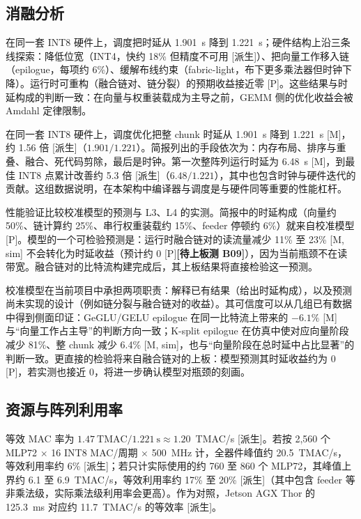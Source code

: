 \documentclass[a4paper,10.5pt]{ctexart}
\newcommand{\tM}{\textsf{[M]}}              %
\newcommand{\tP}{\textsf{[P]}}              %
\newcommand{\tMsim}{\textsf{[M, sim]}}      %
\newcommand{\tD}{\textsf{[派生]}}           %
\newcommand{\tB}[1]{\textcolor{red!70!black}{\textsf{\textbf{[待上板测 #1]}}}}
\begin{document}
\subsection{消融分析}\label{sec:ablation}

在同一套 INT8 硬件上，调度把时延从 1.901~s 降到 1.221~s；硬件结构上沿三条线探索：降低位宽（INT4，快约 18\% 但精度不可用 \tD）、把向量工作移入链（epilogue，每项约 6\%）、缓解布线约束（fabric-light，布下更多乘法器但时钟下降）。运行时可重构（融合链对、链分裂）的预期收益接近零 \tP。这些结果与时延构成的判断一致：在向量与权重装载成为主导之前，GEMM 侧的优化收益会被 Amdahl 定律限制。

在同一套 INT8 硬件上，调度优化把整 chunk 时延从 1.901~s 降到 1.221~s \tM，约 1.56 倍 \tD（$1.901/1.221$）。简报列出的手段依次为：内存布局、排序与重叠、融合、死代码剪除，最后是时钟。第一次整阵列运行时延为 6.48~s \tM，到最佳 INT8 点累计改善约 5.3 倍 \tD（$6.48/1.221$），其中也包含时钟与硬件迭代的贡献。这组数据说明，在本架构中编译器与调度是与硬件同等重要的性能杠杆。

性能验证比较校准模型的预测与 L3、L4 的实测。简报中的时延构成（向量约 50\%、链计算约 25\%、串行权重装载约 15\%、feeder 停顿约 6\%）就来自校准模型 \tP。模型的一个可检验预测是：运行时融合链对的读流量减少 11\% 至 23\% \tMsim{} 不会转化为时延收益（预计约 0 \tP \tB{B09}），因为当前瓶颈不在读带宽。融合链对的比特流构建完成后，其上板结果将直接检验这一预测。

校准模型在当前项目中承担两项职责：解释已有结果（给出时延构成），以及预测尚未实现的设计（例如链分裂与融合链对的收益）。其可信度可以从几组已有数据中得到侧面印证：GeGLU/GELU epilogue 在同一比特流上带来的 $-6.1\%$ \tM{} 与“向量工作占主导”的判断方向一致；K-split epilogue 在仿真中使对应向量阶段减少 81\%、整 chunk 减少 6.4\% \tMsim，也与“向量阶段在总时延中占比显著”的判断一致。更直接的检验将来自融合链对的上板：模型预测其时延收益约为 0 \tP，若实测也接近 0，将进一步确认模型对瓶颈的刻画。

\subsection{资源与阵列利用率}

等效 MAC 率为 $1.47~\text{TMAC}/1.221~\text{s}\approx1.20$~TMAC/s \tD。若按 2,560 个 MLP72 $\times$ 16 INT8 MAC/周期 $\times$ 500~MHz 计，全器件峰值约 20.5~TMAC/s，等效利用率约 6\% \tD；若只计实际使用的约 760 至 860 个 MLP72，其峰值上界约 6.1 至 6.9~TMAC/s，等效利用率约 17\% 至 20\% \tD（其中包含 feeder 等非乘法级，实际乘法级利用率会更高）。作为对照，Jetson AGX Thor 的 125.3~ms 对应约 11.7~TMAC/s 的等效率 \tD。
\end{document}
